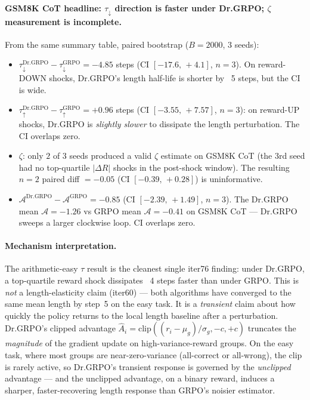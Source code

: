 \documentclass{article}
\begin{document}
\paragraph{GSM8K CoT headline: $\tau_{\downarrow}$ direction is faster under Dr.GRPO; $\zeta$ measurement
is incomplete.}
From the same summary table, paired bootstrap ($B = 2000$, $3$ seeds):
\begin{itemize}
\item $\tau^{\mathrm{Dr.GRPO}}_{\downarrow} - \tau^{\mathrm{GRPO}}_{\downarrow}
      = -4.85$ steps (CI $[-17.6,\,+4.1]$, $n = 3$). On reward-DOWN
      shocks, Dr.GRPO's length half-life is shorter by ~5 steps, but
      the CI is wide.
\item $\tau^{\mathrm{Dr.GRPO}}_{\uparrow} - \tau^{\mathrm{GRPO}}_{\uparrow}
      = +0.96$ steps (CI $[-3.55,\,+7.57]$, $n = 3$): on reward-UP
      shocks, Dr.GRPO is \emph{slightly slower} to dissipate the length
      perturbation. The CI overlaps zero.
\item $\zeta$: only $2$ of $3$ seeds produced a valid $\zeta$ estimate
      on GSM8K CoT (the 3rd seed had no top-quartile $|\Delta R|$
      shocks in the post-shock window). The resulting $n = 2$
      paired diff $= -0.05$ (CI $[-0.39,\,+0.28]$) is uninformative.
\item $\mathcal{A}^{\mathrm{Dr.GRPO}} - \mathcal{A}^{\mathrm{GRPO}}
      = -0.85$ (CI $[-2.39,\,+1.49]$, $n = 3$). The Dr.GRPO mean
      $\mathcal{A} = -1.26$ vs GRPO mean $\mathcal{A} = -0.41$ on
      GSM8K CoT — Dr.GRPO sweeps a larger clockwise loop. CI overlaps
      zero.
\end{itemize}

\paragraph{Mechanism interpretation.}
The arithmetic-easy $\tau$ result is the cleanest single iter76
finding: under Dr.GRPO, a top-quartile reward shock dissipates ~4
steps faster than under GRPO. This is \emph{not} a length-elasticity
claim (iter60) — both algorithms have converged to the same mean
length by step~5 on the easy task. It is a \emph{transient} claim
about how quickly the policy returns to the local length baseline
after a perturbation. Dr.GRPO's clipped advantage
$\hat A_i = \mathrm{clip}((r_i - \mu_g)/\sigma_g, -c, +c)$ truncates
the \emph{magnitude} of the gradient update on
high-variance-reward groups. On the easy task, where most groups are
near-zero-variance (all-correct or all-wrong), the clip is rarely
active, so Dr.GRPO's transient response is governed by the
\emph{unclipped} advantage — and the unclipped advantage, on a binary
reward, induces a sharper, faster-recovering length response than
GRPO's noisier estimator.
\end{document}
